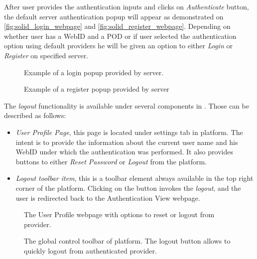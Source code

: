 After user provides the authentication inputs and clicks on \textit{Authenticate} button, the default \solid{} server authentication popup will appear as demonstrated on \autoref{fig:solid_login_webpage} and \autoref{fig:solid_register_webpage}. Depending on whether user has a WebID and a \solid{} POD or if user selected the authentication option using default providers he will be given an option to either \textit{Login} or \textit{Register} on specified \solid{} server. 

\begin{figure}[hbt]
  \caption{Example of a login popup provided by \solid{} server.}
  \label{fig:solid_login_webpage}
\endminipage\hfill
{}
  \caption{Example of a register popup provided by \solid{} server}
  \label{fig:solid_register_webpage}
\endminipage\hfill
\end{figure}

The \textit{logout} functionality is available under several components in \lpa{}. Those can be described as follows:
\begin{itemize}
    \item \textit{User Profile Page}, this page is located under settings tab in \lpa{} platform. The intent is to provide the information about the current user name and his WebID under which the authentication was performed. It also provides buttons to either \textit{Reset Password} or \textit{Logout} from the platform.
    \item \textit{Logout toolbar item}, this is a toolbar element always available in the top right corner of the platform. Clicking on the button invokes the \textit{logout}, and the user is redirected back to the Authentication View webpage.
\end{itemize}

\begin{figure}[hbt]
  \caption{The User Profile webpage with options to reset or logout from \solid{} provider.}
  \label{fig:solid_user_profile_login_webpage}
\endminipage\hfill
{}
  \caption{The global control toolbar of \lpa{} platform. The logout button allows to quickly logout from authenticated \solid{} provider.}
  \label{fig:solid_toolbar_logout}
\endminipage\hfill
\end{figure}

